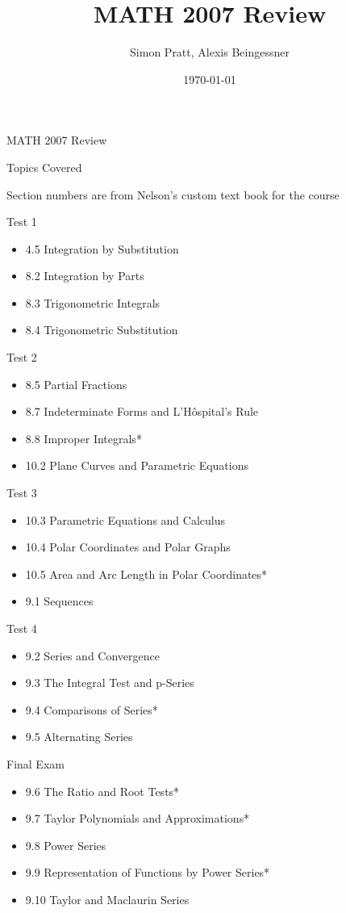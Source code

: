 \documentclass{article}
\title{MATH 2007 Review}
\author{Simon Pratt, Alexis Beingessner}
\date{\today}
\begin{document}
{\Huge MATH 2007 Review}

\vspace{1 cm}

{\huge Topics Covered}

{\tiny Section numbers are from Nelson's custom text book for the course}

Test 1
\begin{itemize}
\item 4.5 Integration by Substitution
\item 8.2 Integration by Parts
\item 8.3 Trigonometric Integrals
\item 8.4 Trigonometric Substitution
\end{itemize}

Test 2
\begin{itemize}
\item 8.5 Partial Fractions
\item 8.7 Indeterminate Forms and L'H\^{o}spital's Rule
\item 8.8 Improper Integrals*
\item 10.2 Plane Curves and Parametric Equations
\end{itemize}

Test 3
\begin{itemize}
\item 10.3 Parametric Equations and Calculus
\item 10.4 Polar Coordinates and Polar Graphs
\item 10.5 Area and Arc Length in Polar Coordinates*
\item 9.1 Sequences
\end{itemize}

Test 4
\begin{itemize}
\item 9.2 Series and Convergence
\item 9.3 The Integral Test and p-Series
\item 9.4 Comparisons of Series*
\item 9.5 Alternating Series
\end{itemize}

Final Exam
\begin{itemize}
\item 9.6 The Ratio and Root Tests*
\item 9.7 Taylor Polynomials and Approximations*
\item 9.8 Power Series
\item 9.9 Representation of Functions by Power Series*
\item 9.10 Taylor and Maclaurin Series
\end{itemize}
\end{document}
